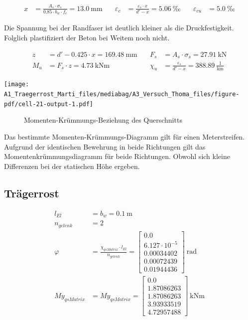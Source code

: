 \documentclass[
  11pt,
  letterpaper,
]{scrreprt}
\begin{document}
\[
\begin{aligned}
x& = \frac{A_{s} \cdot \sigma_{s}}{0.85 \cdot b_{w} \cdot f_{c}} = 13.0 \ \mathrm{mm} \quad & \varepsilon_{c}& = \frac{\varepsilon_{s} \cdot x}{{d}' - x} = 5.06 \ \mathrm{‰} \quad & \varepsilon_{cu}& = 5.0 \ \mathrm{‰} \end{aligned}
\]

Die Spannung bei der Randfaser ist deutlich kleiner als die
Druckfestigkeit. Folglich plastifiziert der Beton bei Weitem noch nicht.

\[
\begin{aligned}
z& = {d}' - 0.425 \cdot x = 169.48 \ \mathrm{mm} \quad & F_{s}& = A_{s} \cdot \sigma_{s} = 27.91 \ \mathrm{kN} \\ 
M_{u}& = F_{s} \cdot z = 4.73 \ \mathrm{kNm} \quad & \chi_{u}& = \frac{\varepsilon_{s}}{{d}' - x} = 388.89 \ \frac{1}{\mathrm{km}} \end{aligned}
\]

\texttt{[image: A1\_Traegerrost\_Marti\_files/mediabag/A3\_Versuch\_Thoma\_files/figure-pdf/cell-21-output-1.pdf]}

\begin{figure}[H]


\caption{\label{fig-tho_M_chi}Momenten-Krümmungs-Beziehung des
Querschnitts}

\end{figure}%

Das bestimmte Momenten-Krümmungs-Diagramm gilt für einen Meterstreifen.
Aufgrund der identischen Bewehrung in beide Richtungen gilt das
Momentenkrümmungsdiagramm für beide Richtungen. Obwohl sich kleine
Differenzen bei der statischen Höhe ergeben.

\subsection{Trägerrost}\label{truxe4gerrost}

\[
\begin{aligned}
l_{El}& = b_{w} = 0.1 \ \mathrm{m} \\ 
n_{gelenk}& = 2 \\ 
\varphi& = \frac{\chi_{qs Matrix} \cdot l_{El}}{n_{gelenk}} = \left[\begin{matrix}0.0\\6.127 \cdot 10^{-5}\\0.00034402\\0.00072439\\0.01944436\end{matrix}\right] \ \mathrm{rad} \\ 
My_{qs Matrix}& = My_{qs Matrix} = \left[\begin{matrix}0.0\\1.87086263\\1.87086263\\3.93933519\\4.72957488\end{matrix}\right] \ \mathrm{kNm} \end{aligned}
\]
\end{document}

